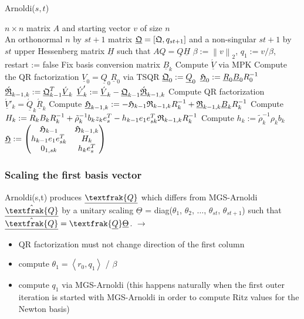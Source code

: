 \documentclass{scrartcl}
\numberwithin{equation}{section}
\newcommand{\norm}[1]{\left\lVert#1\right\rVert}
\begin{document}
\begin{algorithm}[H]
\caption{Arnoldi($s,t$)}
\label{alg:arnoldi(s,t)}
\begin{algorithmic}[1]
    \REQUIRE $n \times n$ matrix $A$ and starting vector $v$ of size $n$\\
    \ENSURE An orthonormal $n$ by $st + 1$ matrix $\underline{\frak{Q}} = \left[\frak{Q},q_{st + 1}\right]$ and a non-singular $st + 1$ by $st$ upper Hessenberg matrix $\underline{H}$ such that $AQ = \underline{Q} \underline{H}$
    \STATE $\beta := \norm{v}_2$, $q_1 := v/\beta$, restart := false
    	\STATE Fix basis conversion matrix $\underline{B}_k$
    	\STATE Compute $\underline{\acute{V}}$ via MPK
 	 		\STATE Compute the QR factorization $\underline{V}_0 = \underline{Q}_0 \underline{R}_0$ via TSQR
 	 	\STATE $\underline{\frak{Q}}_0 := \underline{Q}_0$
    	\STATE $\underline{\frak{H}}_0 := \underline{R}_0 \underline{B}_0 R_0^{-1}$
    	\ELSE
    		\STATE $\underline{\acute{\frak{R}}}_{k - 1, k} := \underline{\frak{Q}}^T_{k - 1} \underline{\acute{V}}_k$
    	\STATE $\underline{\acute{V}}_k' := \underline{\acute{V}}_k - \underline{\frak{Q}}_{k - 1} \underline{\acute{\frak{R}}}_{k - 1, k}$
    	\STATE Compute QR factorization $\underline{\acute{V}}'_k = \underline{\acute{Q}}_k \underline{\acute{R}}_k$
    	\STATE Compute $\underline{\frak{H}}_{k - 1, k} := - \frak{H}_{k - 1} \frak{R}_{k - 1, k} R^{-1}_k + \underline{\frak{R}}_{k - 1, k} \underline{B}_k R^{-1}_k$
		\STATE Compute $H_k := R_k B_k R^{-1}_k + \tilde{\rho}^{-1}_k b_k z_k e^T_s - h_{k-1} e_1 e^T_{sk} \frak{R}_{k-1,k} R^{-1}_k$
		\STATE Compute $h_k := \tilde{\rho}^{-1}_k \rho_k b_k$
    	\STATE $\underline{\frak{H}} : = 
    	\begin{pmatrix}
    		\frak{H}_{k - 1} & \frak{H}_{k - 1, k}\\
    		h_{k - 1} e_1 e_{sk}^T & H_k\\
    		0_{1,sk} & h_k e^T_s
    	\end{pmatrix}$
    	\ENDIF
	\ENDFOR
\end{algorithmic}
\end{algorithm}

\subsubsection{Scaling the first basis vector} \label{sec:scaling_first_basis_vec}
Arnoldi(s,t) produces $\underline{\textfrak{Q}}$ which differs from MGS-Arnoldi $\underline{\hat{\textfrak{Q}}}$ by a unitary scaling $\underline{\Theta}$ = diag($\theta_1$, $\theta_2$, $\ldots$, $\theta_{st}$, $\theta_{st+1}$) such that $\underline{\hat{\textfrak{Q}}} = \textfrak{\underline{Q}}\underline{\Theta}$. $\rightarrow$
\begin{itemize}
\item QR factorization must not change direction of the first column
\item compute $\theta_1 = \left< r_0, q_1 \right>$ / $\beta$
\item compute $q_1$ via MGS-Arnoldi (this happens naturally when the first outer iteration is started with MGS-Arnoldi in order to compute Ritz values for the Newton basis)
\end{itemize}
\end{document}
